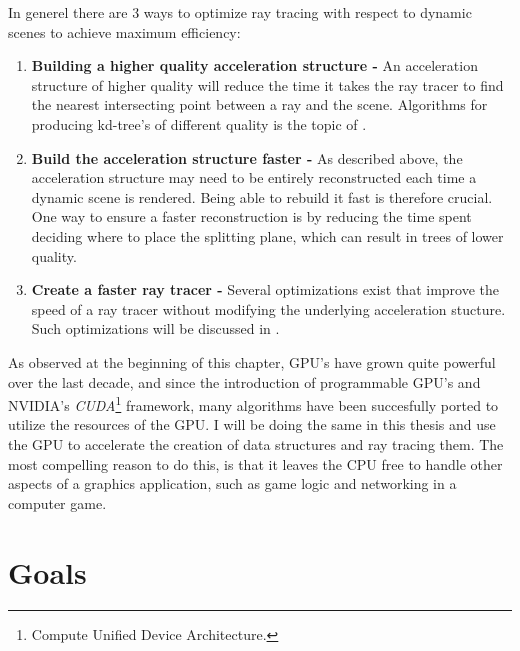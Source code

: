 In generel there are 3 ways to optimize ray tracing with respect to dynamic
scenes to achieve maximum efficiency:

\begin{enumerate}
  \item \textbf{Building a higher quality acceleration structure -} An
    acceleration structure of higher quality will reduce the time it takes the
    ray tracer to find the nearest intersecting point between a ray and the
    scene. Algorithms for producing kd-tree's of different quality is the topic
    of .
  \item \textbf{Build the acceleration structure faster -} As described above,
    the acceleration structure may need to be entirely reconstructed each time a
    dynamic scene is rendered. Being able to rebuild it fast is therefore
    crucial. One way to ensure a faster reconstruction is by reducing the time
    spent deciding where to place the splitting plane, which can result in trees
    of lower quality.
  \item \textbf{Create a faster ray tracer -} Several optimizations exist that
    improve the speed of a ray tracer without modifying the underlying
    acceleration stucture. Such optimizations will be discussed in
    .
\end{enumerate}



As observed at the beginning of this chapter, GPU's have grown quite powerful
over the last decade, and since the introduction of programmable GPU's and
NVIDIA's \textit{CUDA}\footnote{Compute Unified Device Architecture.}
framework, many algorithms have been succesfully ported to utilize the resources
of the GPU. I will be doing the same in this thesis and use the GPU to
accelerate the creation of data structures and ray tracing them. The most
compelling reason to do this, is that it leaves the CPU free to handle other
aspects of a graphics application, such as game logic and networking in a
computer game. 




\section{Goals}

